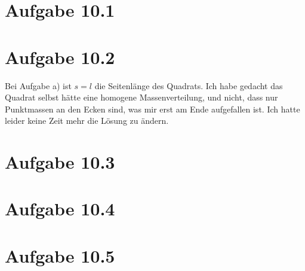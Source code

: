 \documentclass{theozettel}
\begin{document}

\section*{Aufgabe 10.1}





\section*{Aufgabe 10.2} 

Bei Aufgabe a) ist $s = l$ die Seitenlänge des Quadrats. Ich habe gedacht das Quadrat selbst hätte eine homogene Massenverteilung, und nicht, dass nur Punktmassen an den Ecken sind, was mir erst am Ende aufgefallen ist. Ich hatte leider keine Zeit mehr die Lösung zu ändern.



\section*{Aufgabe 10.3} 



\section*{Aufgabe 10.4} 




\section*{Aufgabe 10.5} 
\end{document}
